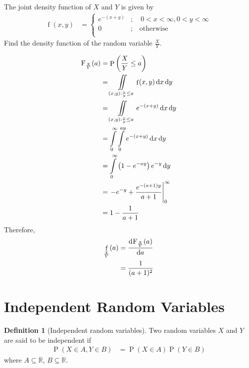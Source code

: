 \documentclass[titlepage, fleqn, a4paper, 12pt, twoside]{article}
\theoremstyle{definition}
\newtheorem{definition}{Definition}
\theoremstyle{theorem}
\DeclareMathOperator{\prob}{\mathrm{P}}
\DeclareMathOperator{\pdf}{\mathrm{f}}
\newcommand*{\cdf}[1]{\mathrm{F}_{#1}}
\begin{document}
\begin{question}
	The joint density function of $X$ and $Y$ is given by
	\begin{align*}
		\pdf(x,y) &=
			\begin{cases}
				e^{-(x + y)} & ;\quad 0 < x < \infty , 0 < y < \infty \\
				0            & ;\quad \text{otherwise}                \\
			\end{cases}
	\end{align*}
	Find the density function of the random variable $\frac{X}{Y}$.
\end{question}

\begin{solution}
	\begin{align*}
		\cdf{\frac{X}{Y}}(a) & = \prob\left( \frac{X}{Y} \le a \right)                                     \\
                                     & = \iint\limits_{(x,y) : \frac{x}{y} \le a} \pdf(x,y) \dif x \dif y          \\
                                     & = \iint\limits_{(x,y) : \frac{x}{y} \le a} e^{-(x + y)} \dif x \dif y       \\
                                     & = \int\limits_{0}^{\infty} \int\limits_{0}^{a y} e^{-(x + y)} \dif x \dif y \\
                                     & = \int\limits_{0}^{\infty} \left( 1 - e^{-a y} \right) e^{-y} \dif y        \\
                                     & = \left. -e^{-y} + \frac{e^{-(a + 1) y}}{a + 1} \right|_{0}^{\infty}        \\
                                     & = 1 - \frac{1}{a + 1}
	\end{align*}
	Therefore,
	\begin{align*}
		\pdf_{\frac{X}{Y}}(a) & = \dod{\cdf{\frac{X}{Y}}(a)}{a} \\
                                      & = \frac{1}{(a + 1)^2}
	\end{align*}
\end{solution}

\section{Independent Random Variables}

\begin{definition}[Independent random variables]
	Two random variables $X$ and $Y$ are said to be independent if
	\begin{align*}
		\prob(X \in A , Y \in B) & = \prob(X \in A) \prob(Y \in B)
	\end{align*}
	where $A \subseteq \mathbb{R}$, $B \subseteq \mathbb{R}$.
\end{definition}
\end{document}
